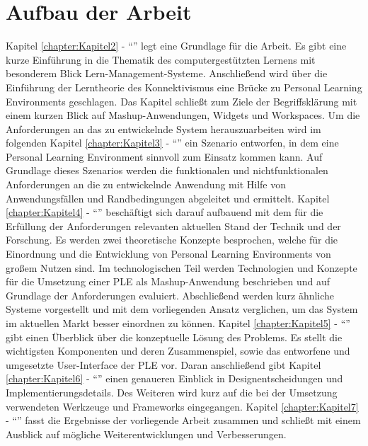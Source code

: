 \section{Aufbau der Arbeit}
Kapitel \ref{chapter:Kapitel2} - "`"' legt eine Grundlage für die Arbeit. Es gibt eine kurze Einführung in die Thematik des computergestützten Lernens mit besonderem Blick Lern-Management-Systeme. Anschließend wird über die Einführung der Lerntheorie des Konnektivismus eine Brücke zu Personal Learning Environments geschlagen. Das Kapitel schließt zum Ziele der Begriffsklärung mit einem kurzen Blick auf Mashup-Anwendungen, Widgets und Workspaces. Um die Anforderungen an das zu entwickelnde System herauszuarbeiten wird im folgenden Kapitel \ref{chapter:Kapitel3} - "`"' ein Szenario entworfen, in dem eine Personal Learning Environment sinnvoll zum Einsatz kommen kann. Auf Grundlage dieses Szenarios werden die funktionalen und nichtfunktionalen Anforderungen an die zu entwickelnde Anwendung mit Hilfe von Anwendungsfällen und Randbedingungen abgeleitet und ermittelt. Kapitel \ref{chapter:Kapitel4} - "`"' beschäftigt sich darauf aufbauend mit dem für die Erfüllung der Anforderungen relevanten aktuellen Stand der Technik und der Forschung. Es werden zwei theoretische Konzepte besprochen, welche für die Einordnung und die Entwicklung von Personal Learning Environments von großem Nutzen sind. Im technologischen Teil werden Technologien und Konzepte für die Umsetzung einer PLE als Mashup-Anwendung beschrieben und auf Grundlage der Anforderungen evaluiert. Abschließend werden kurz ähnliche Systeme vorgestellt und mit dem vorliegenden Ansatz verglichen, um das System im aktuellen Markt besser einordnen zu können. Kapitel \ref{chapter:Kapitel5} - "`"' gibt einen Überblick über die konzeptuelle Lösung des Problems. Es stellt die wichtigsten Komponenten und deren Zusammenspiel, sowie das entworfene und umgesetzte User-Interface der PLE vor. Daran anschließend gibt Kapitel \ref{chapter:Kapitel6} - "`"' einen genaueren Einblick in Designentscheidungen und Implementierungsdetails. Des Weiteren wird kurz auf die bei der Umsetzung verwendeten Werkzeuge und Frameworks eingegangen. Kapitel \ref{chapter:Kapitel7} - "`"' fasst die Ergebnisse der vorliegende Arbeit zusammen und schließt mit einem Ausblick auf mögliche Weiterentwicklungen und Verbesserungen.
